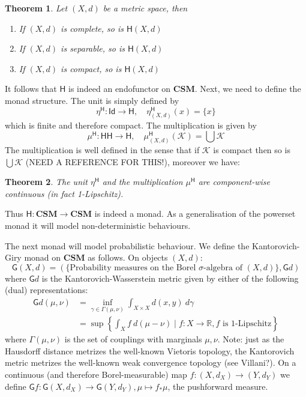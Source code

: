 \documentclass[10pt,a4paper]{article}
\theoremstyle{plain}
\newtheorem{theorem}{Theorem}
\theoremstyle{definition}
\newcommand{\CSM}{\mathbf{CSM}}
\newcommand{\R}{\mathbb{R}}
\newcommand{\Haus}{\mathsf{H}}
\newcommand{\Giry}{\mathsf{G}}
\newcommand{\Id}{\mathsf{Id}}
\begin{document}
\begin{theorem}
Let $(X,d)$ be a metric space, then
\begin{enumerate}
\item If $(X,d)$ is complete, so is $\Haus(X,d)$
\item If $(X,d)$ is separable, so is $\Haus(X,d)$
\item If $(X,d)$ is compact, so is $\Haus(X,d)$
\end{enumerate}
\end{theorem}

It follows that $\Haus$ is indeed an endofunctor on $\CSM$. Next, we need to define the monad structure. The unit is simply defined by
\[
\eta^{\Haus}: \Id\to\Haus,\quad \eta_{(X,d)}^{\Haus}(x)=\{x\}
\]
which is finite and therefore compact. The multiplication is given by
\[
\mu^{\Haus}: \Haus\Haus\to\Haus,\quad\mu_{(X,d)}^{\Haus}(\mathcal{K})=\bigcup\mathcal{K}
\]
The multiplication is well defined in the sense that if $\mathcal{K}$ is compact then so is $\bigcup\mathcal{K}$ (NEED A REFERENCE FOR THIS!), moreover we have:
\begin{theorem}
The unit $\eta^{\Haus}$ and the multiplication $\mu^{\Haus}$ are component-wise continuous (in fact 1-Lipschitz).
\end{theorem}
Thus $\Haus:\CSM\to\CSM$ is indeed a monad. As a generalisation of the powerset monad it will model non-deterministic behaviours.

The next monad will model probabilistic behaviour. We define the Kantorovich-Giry monad  
on $\CSM$ as follows. On objects $(X,d)$:
\[
\Giry(X,d)=\left(\{\text{Probability measures on the Borel }\sigma\text{-algebra of }(X,d)\}, \Giry d\right)
\]
where $\Giry d$ is the Kantorovich-Wasserstein metric given by either of the following (dual) representations:
\begin{align*}
\Giry d(\mu,\nu)&=\inf_{\gamma\in\Gamma(\mu,\nu)}\int_{X\times X} d(x,y)~d\gamma\\
&=\sup\left\{\int_X f~d(\mu-\nu)\mid f: X\to \R, f\text{ is 1-Lipschitz}\right\}
\end{align*}
where $\Gamma(\mu,\nu)$ is the set of couplings with marginals $\mu,\nu$.
Note: just as the Hausdorff distance metrizes the well-known Vietoris topology, the Kantorovich metric metrizes the well-known weak convergence topology (see Villani?).
On a continuous (and therefore Borel-measurable) map $f:(X,d_X)\to(Y,d_Y)$ we define $\Giry f: \Giry(X,d_X)\to\Giry(Y,d_Y), \mu\mapsto f_\ast\mu$, the pushforward measure.
\end{document}
